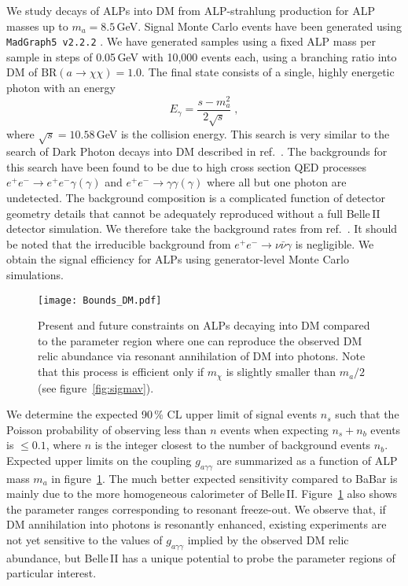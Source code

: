 \documentclass[11pt,a4paper]{article}
\newcommand{\ga}{g_{a\gamma\gamma}}
\def \belletwo {Belle\,II\xspace}
\def \babar {BaBar\xspace}
\begin{document}
We study decays of ALPs into DM from ALP-strahlung production for ALP masses up to $m_{a}=8.5$\,GeV. Signal Monte Carlo events have been generated using \hbox{\texttt{MadGraph5\,v2.2.2}} \cite{Alwall:2014hca}. We have generated samples using a fixed ALP mass per sample in steps of 0.05\,GeV with 10,000 events each, using a branching ratio into DM of $\text{BR}(a\to\chi \chi)=1.0$. The final state consists of a single, highly energetic photon with an energy
\begin{equation}
\label{eq:recoilenergy}
E_{\gamma} = \frac{s-m_{a}^2}{2\sqrt{s}} \; ,
\end{equation}
where $\sqrt{s}=10.58$\,GeV is the collision energy. This search is very similar to the search of Dark Photon decays into DM described in ref.~\cite{lit:b2tip}. The backgrounds for this search have been found to be due to high cross section QED processes $e^+e^-\to e^+e^-\gamma(\gamma)$ and $e^+e^-\to\gamma\gamma(\gamma)$ where all but one photon are undetected. The background composition is a complicated function of detector geometry details that cannot be adequately reproduced without a full \belletwo detector simulation. We therefore take the background rates from ref.~\cite{lit:b2tip}. It should be noted that the irreducible background from $e^+e^-\to \nu \bar{\nu}\gamma$ is negligible. We obtain the signal efficiency for ALPs using generator-level Monte Carlo simulations.

\begin{figure}
\centering
\texttt{[image: Bounds\_DM.pdf]}
\caption{\label{fig:BelleII_inv} Present and future constraints on ALPs decaying into DM compared to the parameter region where one can reproduce the observed DM relic abundance via resonant annihilation of DM into photons. Note that this process is efficient only if $m_\chi$ is slightly smaller than $m_a / 2$ (see figure~\ref{fig:sigmav}).}
\end{figure}

We determine the expected 90\,\% CL upper limit of signal events $n_s$ such that the Poisson probability of observing less than $n$ events when expecting $n_s+n_b$ events is $\leq0.1$, where $n$ is the integer closest to the number of background events $n_b$. Expected upper limits on the coupling $\ga$ are summarized as a function of ALP mass $m_{a}$ in figure~\ref{fig:BelleII_inv}. The much better expected sensitivity compared to \babar is mainly due to the more homogeneous calorimeter of \belletwo. Figure~\ref{fig:BelleII_inv} also shows the parameter ranges corresponding to resonant freeze-out. We observe that, if DM annihilation into photons is resonantly enhanced, existing experiments are not yet sensitive to the values of $\ga$ implied by the observed DM relic abundance, but \belletwo has a unique potential to probe the parameter regions of particular interest.
\end{document}
